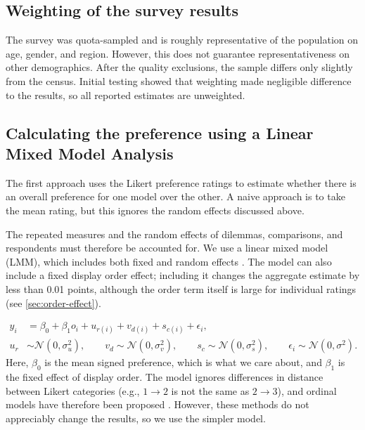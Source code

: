 \subsection{Weighting of the survey results}

The survey was quota-sampled and is roughly representative of the population on age, gender, and region. However, this does not guarantee representativeness on other demographics. After the quality exclusions, the sample differs only slightly from the census. Initial testing showed that weighting made negligible difference to the results, so all reported estimates are unweighted.

\subsection{Calculating the preference using a Linear Mixed Model Analysis}

The first approach uses the Likert preference ratings to estimate whether there is an overall preference for one model over the other. A naive approach is to take the mean rating, but this ignores the random effects discussed above.

The repeated measures and the random effects of dilemmas, comparisons, and respondents must therefore be accounted for. We use a linear mixed model (LMM), which includes both fixed and random effects \cite{batesFittingLinearMixedEffects2015}. The model can also include a fixed display order effect; including it changes the aggregate estimate by less than 0.01 points, although the order term itself is large for individual ratings (see \ref{sec:order-effect}).

\begin{align}
\label{eq:lmm}
y_i &= \beta_0 + \beta_1 o_i + u_{r(i)} + v_{d(i)} + s_{c(i)} + \epsilon_i,\\
u_r &\sim \mathcal{N}(0, \sigma_u^2),
\qquad
v_d \sim \mathcal{N}(0, \sigma_v^2),
\qquad
s_c \sim \mathcal{N}(0, \sigma_s^2),
\qquad
\epsilon_i \sim \mathcal{N}(0, \sigma^2).
\end{align}
\noindent Here, $\beta_0$ is the mean signed preference, which is what we care about, and $\beta_1$ is the fixed effect of display order. The model ignores differences in distance between Likert categories (e.g., $1 \to 2$ is not the same as $2 \to 3$), and ordinal models have therefore been proposed \cite{taylorRatingNormsShould2023}. However, these methods do not appreciably change the results, so we use the simpler model.

